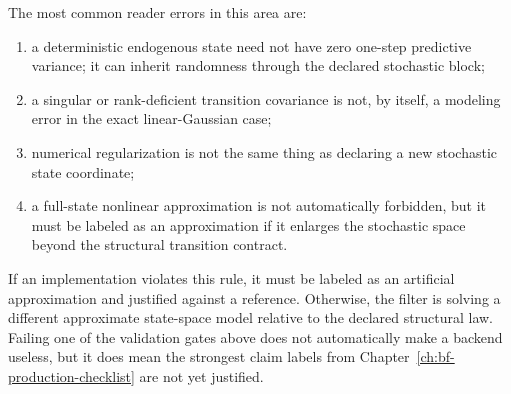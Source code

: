 The most common reader errors in this area are:
\begin{enumerate}[label=(\roman*)]
  \item a deterministic endogenous state need not have zero one-step predictive
    variance; it can inherit randomness through the declared stochastic block;
  \item a singular or rank-deficient transition covariance is not, by itself, a
    modeling error in the exact linear-Gaussian case;
  \item numerical regularization is not the same thing as declaring a new
    stochastic state coordinate;
  \item a full-state nonlinear approximation is not automatically forbidden, but
    it must be labeled as an approximation if it enlarges the stochastic space
    beyond the structural transition contract.
\end{enumerate}

\begin{center}
\end{center}

If an implementation violates this rule, it must be labeled as an artificial
approximation and justified against a reference.  Otherwise, the filter is
solving a different approximate state-space model relative to the declared
structural law.  Failing one of the validation gates above does not
automatically make a backend useless, but it does mean the strongest claim
labels from Chapter~\ref{ch:bf-production-checklist} are not yet justified.
